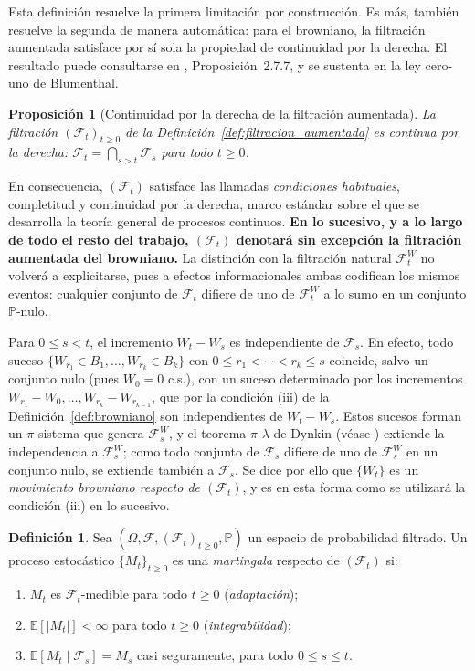 \documentclass[11pt,a4paper,oneside]{report}
\theoremstyle{plain}
\newtheorem{proposicion}[teorema]{Proposición}
\theoremstyle{definition}
\newtheorem{definicion}[teorema]{Definición}
\theoremstyle{remark}
\newcommand{\E}{\mathbb{E}}
\newcommand{\PP}{\mathbb{P}}
\newcommand{\F}{\mathcal{F}}
\newcommand{\1}{\mathbf{1}}
\begin{document}
Esta definición resuelve la primera limitación por construcción.
Es más, también resuelve la segunda de manera automática:
para el browniano, la filtración aumentada satisface por sí sola
la propiedad de continuidad por la derecha. El resultado puede consultarse en \cite{karatzas-shreve}, Proposición~2.7.7, y se
sustenta en la ley cero-uno de Blumenthal.

\begin{proposicion}[Continuidad por la derecha de la filtración
aumentada]
\label{prop:filtracion_continua_derecha}
La filtración $(\F_t)_{t \geq 0}$ de la
Definición~\ref{def:filtracion_aumentada} es continua por la
derecha: $\F_t = \bigcap_{s > t} \F_s$ para todo $t \geq 0$.
\end{proposicion}

En consecuencia, $(\F_t)$ satisface las llamadas \emph{condiciones
habituales}, completitud y continuidad por la derecha, marco
estándar sobre el que se desarrolla la teoría general de procesos
continuos. \textbf{En lo sucesivo, y a lo largo de todo el resto del
trabajo, $(\F_t)$ denotará sin excepción la filtración aumentada del
browniano.} La distinción con la filtración natural $\F_t^W$ no
volverá a explicitarse, pues a efectos informacionales ambas
codifican los mismos eventos: cualquier conjunto de $\F_t$ difiere
de uno de $\F_t^W$ a lo sumo en un conjunto $\PP$-nulo.

Para $0 \leq s < t$, el incremento $W_t - W_s$ es independiente de $\F_s$. En efecto, todo suceso $\{W_{r_1} \in B_1, \ldots, W_{r_k} \in B_k\}$ con $0 \leq r_1 < \cdots < r_k \leq s$ coincide, salvo un conjunto nulo (pues $W_0 = 0$ c.s.), con un suceso determinado por los incrementos $W_{r_1} - W_0, \ldots, W_{r_k} - W_{r_{k-1}}$, que por la condición (iii) de la Definición~\ref{def:browniano} son independientes de $W_t - W_s$. Estos sucesos forman un $\pi$-sistema que genera $\F_s^W$, y el teorema $\pi$-$\lambda$ de Dynkin (véase \cite{williams}) extiende la independencia a $\F_s^W$; como todo conjunto de $\F_s$ difiere de uno de $\F_s^W$ en un conjunto nulo, se extiende también a $\F_s$. Se dice por ello que $\{W_t\}$ es un \emph{movimiento browniano respecto de $(\F_t)$}, y es en esta forma como se utilizará la condición (iii) en lo sucesivo.

\medskip

\begin{definicion}
\label{def:martingala_continua}
Sea $(\Omega, \F, (\F_t)_{t \geq 0}, \PP)$ un espacio de probabilidad
filtrado. Un proceso estocástico $\{M_t\}_{t \geq 0}$ es una
\emph{martingala} respecto de $(\F_t)$ si:
\begin{enumerate}[label=\textnormal{(\roman*)}]
  \item $M_t$ es $\F_t$-medible para todo $t \geq 0$ (\emph{adaptación});
  \item $\E[|M_t|] < \infty$ para todo $t \geq 0$ (\emph{integrabilidad});
  \item $\E[M_t \mid \F_s] = M_s$ casi seguramente, para todo $0 \leq s
        \leq t$.
\end{enumerate}
\end{definicion}
\end{document}
